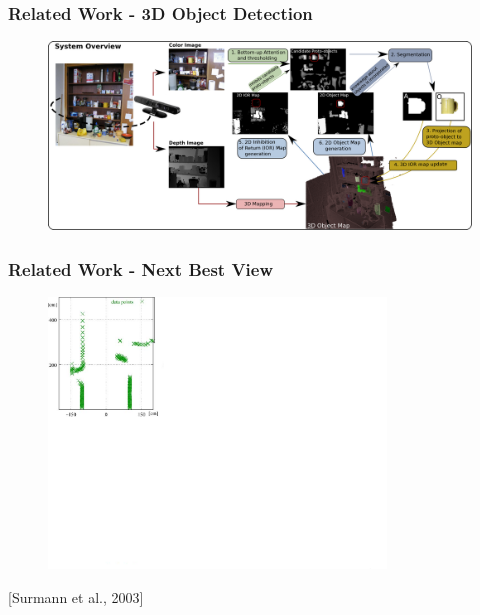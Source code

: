 \documentclass[t]{beamer} %
\begin{document}
\begin{frame}
	\frametitle{ Related Work - 3D Object Detection }
	\begin{figure}[h]
		\includegraphics[width=1\textwidth]{src/frintrop.png}
	\end{figure}
	\centering
	\scriptsize \cite{garcia2013computational}
\end{frame}

\begin{frame}
	\frametitle{ Related Work - Next Best View}
	\begin{figure}[h]
		\includegraphics[width=0.8\textwidth]{src/nbv1.png}
	\end{figure}
	\centering
	\scriptsize [Surmann et al., 2003]
\end{frame}
\end{document}
